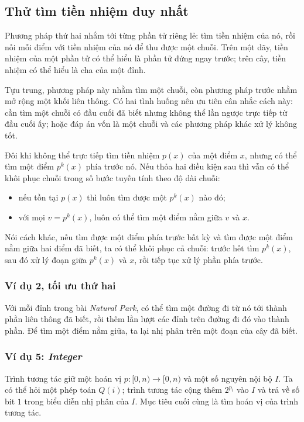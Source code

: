 \documentclass[11pt]{article}
\begin{document}
\subsection{Thử tìm tiền nhiệm duy nhất}

Phương pháp thứ hai nhắm tới từng phần tử riêng lẻ: tìm tiền nhiệm của nó, rồi
nối mỗi điểm với tiền nhiệm của nó để thu được một chuỗi. Trên một dãy, tiền
nhiệm của một phần tử có thể hiểu là phần tử đứng ngay trước; trên cây, tiền
nhiệm có thể hiểu là cha của một đỉnh.

Tựu trung, phương pháp này nhằm tìm một chuỗi, còn phương pháp trước nhằm mở
rộng một khối liên thông. Có hai tình huống nên ưu tiên cân nhắc cách này: cần
tìm một chuỗi có đầu cuối đã biết nhưng không thể lần ngược trực tiếp từ đầu
cuối ấy; hoặc đáp án vốn là một chuỗi và các phương pháp khác xử lý không tốt.

Đôi khi không thể trực tiếp tìm tiền nhiệm $p(x)$ của một điểm $x$, nhưng có
thể tìm một điểm $p^k(x)$ phía trước nó. Nếu thỏa hai điều kiện sau thì vẫn có
thể khôi phục chuỗi trong số bước tuyến tính theo độ dài chuỗi:
\begin{itemize}
  \item nếu tồn tại $p(x)$ thì luôn tìm được một $p^k(x)$ nào đó;
  \item với mọi $v=p^k(x)$, luôn có thể tìm một điểm nằm giữa $v$ và $x$.
\end{itemize}

Nói cách khác, nếu tìm được một điểm phía trước bất kỳ và tìm được một điểm
nằm giữa hai điểm đã biết, ta có thể khôi phục cả chuỗi: trước hết tìm
$p^k(x)$, sau đó xử lý đoạn giữa $p^k(x)$ và $x$, rồi tiếp tục xử lý phần phía
trước.

\subsubsection{Ví dụ 2, tối ưu thứ hai}

Với mỗi đỉnh trong bài \emph{Natural Park}, có thể tìm một đường đi từ nó tới
thành phần liên thông đã biết, rồi thêm lần lượt các đỉnh trên đường đi đó vào
thành phần. Để tìm một điểm nằm giữa, ta lại nhị phân trên một đoạn của cây đã
biết.

\subsubsection{Ví dụ 5: \emph{Integer}}

Trình tương tác giữ một hoán vị $p:[0,n)\to[0,n)$ và một số nguyên nội bộ $I$.
Ta có thể hỏi một phép toán $Q(i)$; trình tương tác cộng thêm $2^{p_i}$ vào
$I$ và trả về số bit $1$ trong biểu diễn nhị phân của $I$. Mục tiêu cuối cùng
là tìm hoán vị của trình tương tác.
\end{document}
